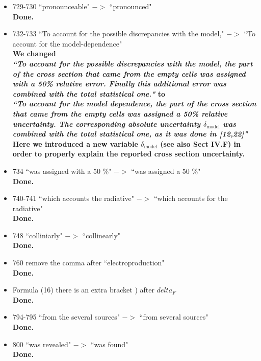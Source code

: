 \documentclass[,superscriptaddress,showpacs,amssymb,amsmath,amsfonts,linenumbers,article]{revtex4-1}
\begin{document}
\begin{itemize}
\item 729-730 ``pronounceable" $->$ ``pronounced"\\[0.5cm]
{\bf Done.}

\item 732-733 ``To account for the possible discrepancies with the model," $->$ ``To account for the model-dependence"\\
{\bf We changed\\
 \textbf{\textit{``To account for the possible discrepancies with the model, the part of the cross section that came from the empty cells was assigned with a 50\% relative error. Finally this additional error was combined with the total statistical one."}} to\\
 \textbf{\textit{``To account for the model dependence, the part of the cross section that came from the empty cells was assigned a 50\% relative uncertainty. The corresponding absolute uncertainty $\delta_{\text{model}}$ was combined with the total statistical one, as it was done in [12,22]"}}\\
Here we introduced a new variable $\delta_{\text{model}}$ (see also Sect IV.F) in order to properly explain the reported cross section uncertainty.
 }

\item 734 ``was assigned with a 50 \%" $->$ ``was assigned a 50 \%"\\[0.5cm]
{\bf Done. }

\item 740-741 ``which accounts the radiative" $->$ ``which accounts for the radiative"\\[0.5cm]
{\bf Done.}

\item 748 ``colliniarly" $->$ ``collinearly"\\[0.5cm]
{\bf Done.}

\item 760 remove the comma after ``electroproduction"\\[0.5cm]
{\bf Done.}

\item Formula (16) there is an extra bracket ) after $delta_{F}$\\[0.5cm]
{\bf Done.}

\item 794-795 ``from the several sources" $->$ ``from several sources"\\[0.5cm]
{\bf Done.}

\item 800 ``was revealed" $->$ ``was found"\\[0.5cm]
{\bf Done.}


\end{itemize}
\end{document}
